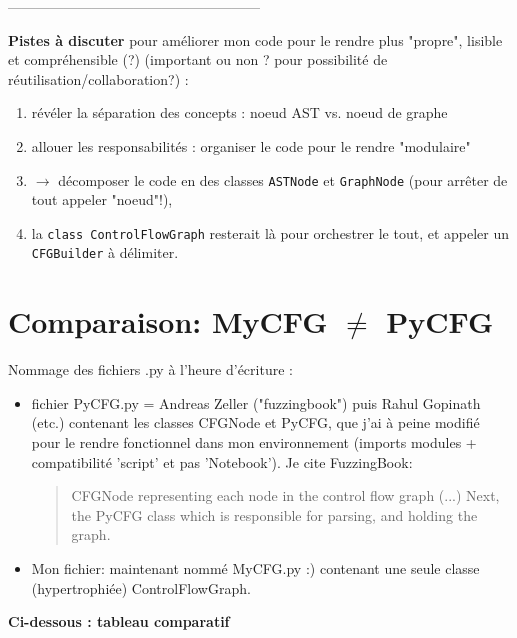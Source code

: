 \documentclass[11pt,a4paper]{article}
\begin{document}
------------------------------------------------------

\textbf{Pistes à discuter} pour améliorer mon code pour le rendre plus "propre", lisible et compréhensible (?) (important ou non ? pour possibilité de réutilisation/collaboration?) :
\begin{enumerate}
    \item révéler la séparation des concepts : noeud AST vs. noeud de graphe
    \item allouer les responsabilités : organiser le code pour le rendre "modulaire"
    \item $\longrightarrow$ décomposer le code en des classes \texttt{ASTNode} et  \texttt{GraphNode} (pour arrêter de tout appeler "noeud"!), 
    \item la \texttt{class ControlFlowGraph} resterait là pour orchestrer le tout, et appeler un  \texttt{CFGBuilder} à délimiter.  
\end{enumerate}

\section{Comparaison: MyCFG $\neq$ PyCFG}

Nommage des fichiers .py à l'heure d'écriture : \newline
\begin{itemize}
    \item fichier PyCFG.py = Andreas Zeller ("fuzzingbook") puis Rahul Gopinath (etc.) contenant les classes CFGNode et PyCFG, que j'ai à peine modifié pour le rendre fonctionnel dans mon environnement (imports modules + compatibilité 'script' et pas 'Notebook').
Je cite FuzzingBook:
\begin{quote}
    CFGNode representing each node in the control flow graph (...) Next, the PyCFG class which is responsible for parsing, and holding the graph.
\end{quote}
    \item Mon fichier: maintenant nommé MyCFG.py :) contenant une seule classe (hypertrophiée) ControlFlowGraph.
\end{itemize}

\noindent\textbf{Ci-dessous : tableau comparatif}
\end{document}
